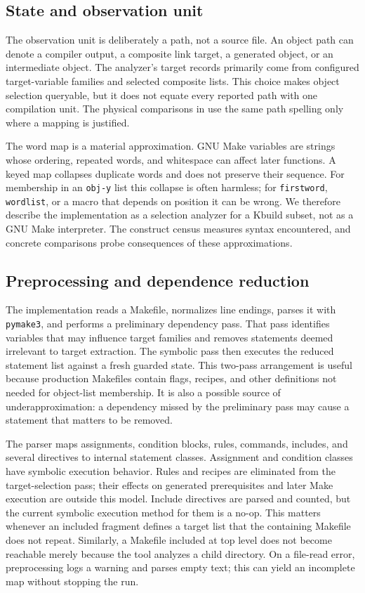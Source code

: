 \documentclass[acmsmall,screen,review]{acmart}
\begin{document}
\subsection{State and observation unit}
The observation unit is deliberately a path, not a source file. An object path can denote a compiler output, a composite link target, a generated object, or an intermediate object. The analyzer's target records primarily come from configured target-variable families and selected composite lists. This choice makes object selection queryable, but it does not equate every reported path with one compilation unit. The physical comparisons in  use the same path spelling only where a mapping is justified.

The word map is a material approximation. GNU Make variables are strings whose ordering, repeated words, and whitespace can affect later functions. A keyed map collapses duplicate words and does not preserve their sequence. For membership in an \texttt{obj-y} list this collapse is often harmless; for \texttt{firstword}, \texttt{wordlist}, or a macro that depends on position it can be wrong. We therefore describe the implementation as a selection analyzer for a Kbuild subset, not as a GNU Make interpreter. The construct census measures syntax encountered, and concrete comparisons probe consequences of these approximations.

\subsection{Preprocessing and dependence reduction}
The implementation reads a Makefile, normalizes line endings, parses it with \texttt{pymake3}, and performs a preliminary dependency pass. That pass identifies variables that may influence target families and removes statements deemed irrelevant to target extraction. The symbolic pass then executes the reduced statement list against a fresh guarded state. This two-pass arrangement is useful because production Makefiles contain flags, recipes, and other definitions not needed for object-list membership. It is also a possible source of underapproximation: a dependency missed by the preliminary pass may cause a statement that matters to be removed.

The parser maps assignments, condition blocks, rules, commands, includes, and several directives to internal statement classes. Assignment and condition classes have symbolic execution behavior. Rules and recipes are eliminated from the target-selection pass; their effects on generated prerequisites and later Make execution are outside this model. Include directives are parsed and counted, but the current symbolic execution method for them is a no-op. This matters whenever an included fragment defines a target list that the containing Makefile does not repeat. Similarly, a Makefile included at top level does not become reachable merely because the tool analyzes a child directory. On a file-read error, preprocessing logs a warning and parses empty text; this can yield an incomplete map without stopping the run.
\end{document}
